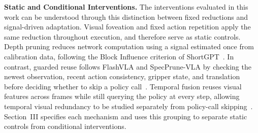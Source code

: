 \noindent\textbf{Static and Conditional Interventions.}
The interventions evaluated in this work can be understood through this distinction between fixed reductions and signal-driven adaptation. Visual foveation and fixed action repetition apply the same reduction throughout execution, and therefore serve as static controls. Depth pruning reduces network computation using a signal estimated once from calibration data, following the Block Influence criterion of ShortGPT~\cite{shortgpt}. In contrast, guarded reuse follows FlashVLA and SpecPrune-VLA by checking the newest observation, recent action consistency, gripper state, and translation before deciding whether to skip a policy call~\cite{flashvla,specprune}. Temporal fusion reuses visual features across frames while still querying the policy at every step, allowing temporal visual redundancy to be studied separately from policy-call skipping~\cite{ttfvla,vlainfoentropy,vlaiap}. Section~III specifies each mechanism and uses this grouping to separate static controls from conditional interventions.




